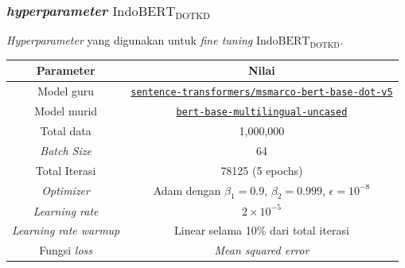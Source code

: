 \documentclass[10pt]{beamer}
\newcommand{\f}[1]{\textit{#1}}
\newcommand{\code}[1]{\texttt{#1}}
\begin{document}
\begin{frame}
    \frametitle{\f{hyperparameter} $\text{IndoBERT}_{\text{DOTKD}}$}
    \f{Hyperparameter} yang digunakan untuk \f{fine tuning }$\text{IndoBERT}_{\text{DOTKD}}$.
    \begin{table}[!ht]
        \centering
        \small
        \label{tab:indobert-kd-hyperparameter}
        \begin{tabular}{|c|c|}
            \hline
            \textbf{Parameter}       & \textbf{Nilai}                                                                                    \\
            \hline
            Model guru              & \href{https://huggingface.co/sentence-transformers/msmarco-bert-base-dot-v5}{\code{sentence-transformers/msmarco-bert-base-dot-v5}} \\
            \hline
            Model murid           & \href{https://huggingface.co/bert-base-multilingual-uncased}{\code{bert-base-multilingual-uncased}} \\
            \hline
            Total data               & 1,000,000                                                                                           \\
            \hline
            \f{Batch Size}           & 64                                                                                                \\
            \hline
            Total Iterasi            & 78125 (5 epochs)                                                                                  \\
            \hline
            \f{Optimizer}            & Adam dengan $\beta_1 = 0.9$, $\beta_2 = 0.999$, $\epsilon = 10^{-8}$                                 \\
            \hline
            \f{Learning rate}        & $2\times 10^{-5}$ \\
            \hline
            \f{Learning rate warmup} & Linear selama 10\% dari total iterasi                                                             \\
            \hline
            Fungsi \f{loss}          & \f{Mean squared error}                                                                            \\
            \hline
        \end{tabular}
    \end{table}
\end{frame}
\end{document}
